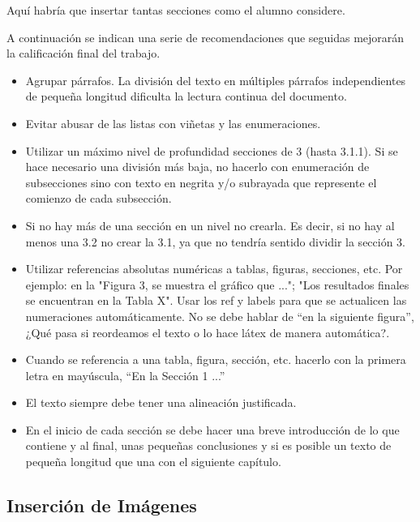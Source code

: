 \documentclass{pre-tfg}
\begin{document}
Aquí habría que insertar tantas secciones como el alumno considere.

A continuación se indican una serie de recomendaciones que seguidas mejorarán la calificación final del trabajo.

\begin{itemize}
 \item Agrupar párrafos. La división del texto en múltiples párrafos independientes de pequeña longitud dificulta la lectura continua del documento.
\item  Evitar abusar de las listas con viñetas y las enumeraciones.
\item Utilizar un máximo nivel de profundidad secciones de 3 (hasta 3.1.1). Si se hace necesario una división más baja, no hacerlo con enumeración de subsecciones sino con texto en negrita y/o subrayada que represente el comienzo de cada subsección. 
\item  Si no hay más de una sección en un nivel no crearla. Es decir, si no hay al menos una 3.2 no crear la 3.1, ya que no tendría sentido dividir la sección 3.
\item  Utilizar referencias absolutas numéricas a tablas, figuras, secciones, etc. Por ejemplo: en la "Figura 3, se muestra el gráfico que  ..."; "Los resultados finales se encuentran en la Tabla X". Usar los ref y labels para que se actualicen las numeraciones automáticamente. No se debe hablar de ``en la siguiente figura'', ¿Qué pasa si reordeamos el texto o lo hace látex de manera automática?.
\item Cuando se referencia a una tabla, figura, sección, etc. hacerlo con la primera letra en mayúscula, ``En la Sección 1 ...''
\item  El texto siempre debe tener una alineación justificada. 
\item En el inicio de cada sección se debe hacer una breve introducción de lo que contiene y al final, unas pequeñas conclusiones y si es posible un texto de pequeña longitud que una con el siguiente capítulo.
\end{itemize}


\subsection{Inserción de Imágenes}
\end{document}
